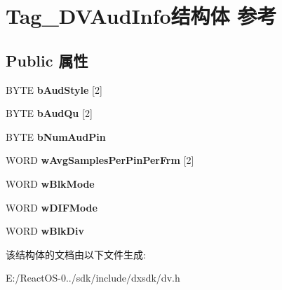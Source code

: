 \hypertarget{struct_tag___d_v_aud_info}{}\section{Tag\+\_\+\+D\+V\+Aud\+Info结构体 参考}
\label{struct_tag___d_v_aud_info}
\subsection*{Public 属性}
\begin{DoxyCompactItemize}
\item 
\mbox{\label{struct_tag___d_v_aud_info_aea56b6f6642b028ebeb59c223c933d64}} 
B\+Y\+TE {\bfseries b\+Aud\+Style} \mbox{[}2\mbox{]}
\item 
\mbox{\label{struct_tag___d_v_aud_info_ae9d71f6acac52fe4f77330410f1b4b4c}} 
B\+Y\+TE {\bfseries b\+Aud\+Qu} \mbox{[}2\mbox{]}
\item 
\mbox{\label{struct_tag___d_v_aud_info_a849aba6858b166c3a410e75ffdd5e520}} 
B\+Y\+TE {\bfseries b\+Num\+Aud\+Pin}
\item 
\mbox{\label{struct_tag___d_v_aud_info_a46429f2a7541045f67476d976cda47bd}} 
W\+O\+RD {\bfseries w\+Avg\+Samples\+Per\+Pin\+Per\+Frm} \mbox{[}2\mbox{]}
\item 
\mbox{\label{struct_tag___d_v_aud_info_a43db89d24a72a46025af4dbf9ce444d7}} 
W\+O\+RD {\bfseries w\+Blk\+Mode}
\item 
\mbox{\label{struct_tag___d_v_aud_info_ad3fc06fb9682695f5269b81f47c3f418}} 
W\+O\+RD {\bfseries w\+D\+I\+F\+Mode}
\item 
\mbox{\label{struct_tag___d_v_aud_info_aa69ad38bf0e7d4236c96c77c4e1bf847}} 
W\+O\+RD {\bfseries w\+Blk\+Div}
\end{DoxyCompactItemize}


该结构体的文档由以下文件生成\+:\begin{DoxyCompactItemize}
\item 
E\+:/\+React\+O\+S-\/0../sdk/include/dxsdk/dv.\+h\end{DoxyCompactItemize}
